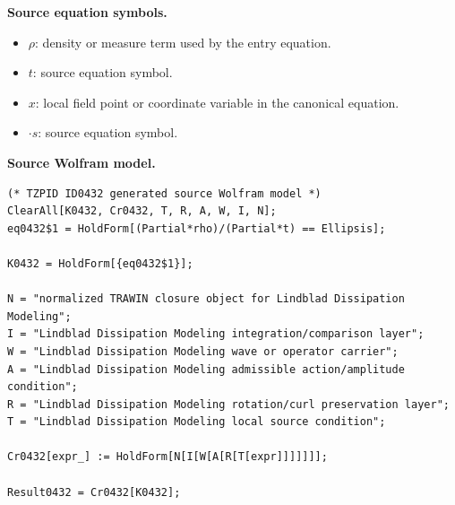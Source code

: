 \begin{minipage}[t]{0.49\linewidth}
\begingroup
\small
\raggedright
\textbf{Source equation symbols.}\par
\begin{itemize}[leftmargin=1.35em,itemsep=1pt,topsep=1pt,parsep=0pt]
    \item $\rho$: density or measure term used by the entry equation.
    \item $t$: source equation symbol.
    \item $x$: local field point or coordinate variable in the canonical equation.
    \item $\cdot s$: source equation symbol.
\end{itemize}
\endgroup
\end{minipage}\hfill
\begin{minipage}[t]{0.47\linewidth}
\begingroup
\scriptsize
\raggedright
\textbf{Source Wolfram model.}\par
\begin{Verbatim}[fontsize=\tiny,breaklines=true,breakanywhere=true]
(* TZPID ID0432 generated source Wolfram model *)
ClearAll[K0432, Cr0432, T, R, A, W, I, N];
eq0432$1 = HoldForm[(Partial*rho)/(Partial*t) == Ellipsis];

K0432 = HoldForm[{eq0432$1}];

N = "normalized TRAWIN closure object for Lindblad Dissipation Modeling";
I = "Lindblad Dissipation Modeling integration/comparison layer";
W = "Lindblad Dissipation Modeling wave or operator carrier";
A = "Lindblad Dissipation Modeling admissible action/amplitude condition";
R = "Lindblad Dissipation Modeling rotation/curl preservation layer";
T = "Lindblad Dissipation Modeling local source condition";

Cr0432[expr_] := HoldForm[N[I[W[A[R[T[expr]]]]]]];

Result0432 = Cr0432[K0432];
\end{Verbatim}
\endgroup
\end{minipage}

